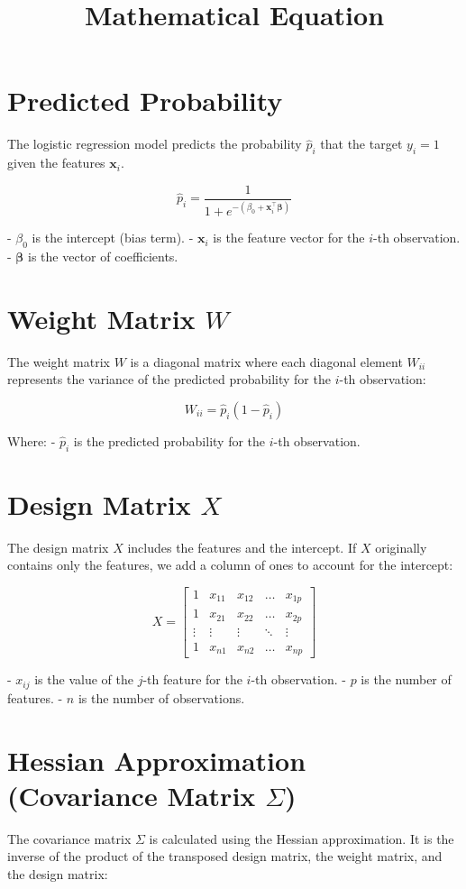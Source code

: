 \documentclass[10pt]{article}
\begin{document}
\title{Mathematical Equation}


\section*{Predicted Probability}
   The logistic regression model predicts the probability \( \hat{p}_i \) that the target \( y_i = 1 \) given the features \( \mathbf{x}_i \).

   \[
   \hat{p}_i = \frac{1}{1 + e^{-(\beta_0 + \mathbf{x}_i^\top \boldsymbol{\beta})}}
   \]

   - \( \beta_0 \) is the intercept (bias term).
   - \( \mathbf{x}_i \) is the feature vector for the \(i\)-th observation.
   - \( \boldsymbol{\beta} \) is the vector of coefficients.

\section*{Weight Matrix \( W \)}
   The weight matrix \( W \) is a diagonal matrix where each diagonal element \( W_{ii} \) represents the variance of the predicted probability for the \(i\)-th observation:

   \[
   W_{ii} = \hat{p}_i (1 - \hat{p}_i)
   \]

   Where:
   - \( \hat{p}_i \) is the predicted probability for the \(i\)-th observation.

\section*{Design Matrix \( X \)}
   The design matrix \( X \) includes the features and the intercept. If \( X \) originally contains only the features, we add a column of ones to account for the intercept:

   \[
   X = \begin{bmatrix}
   1 & x_{11} & x_{12} & \dots & x_{1p} \\
   1 & x_{21} & x_{22} & \dots & x_{2p} \\
   \vdots & \vdots & \vdots & \ddots & \vdots \\
   1 & x_{n1} & x_{n2} & \dots & x_{np}
   \end{bmatrix}
   \]

   - \( x_{ij} \) is the value of the \(j\)-th feature for the \(i\)-th observation.
   - \( p \) is the number of features.
   - \( n \) is the number of observations.

\section*{Hessian Approximation (Covariance Matrix \( \Sigma \))}
   The covariance matrix \( \Sigma \) is calculated using the Hessian approximation. It is the inverse of the product of the transposed design matrix, the weight matrix, and the design matrix:
\end{document}
